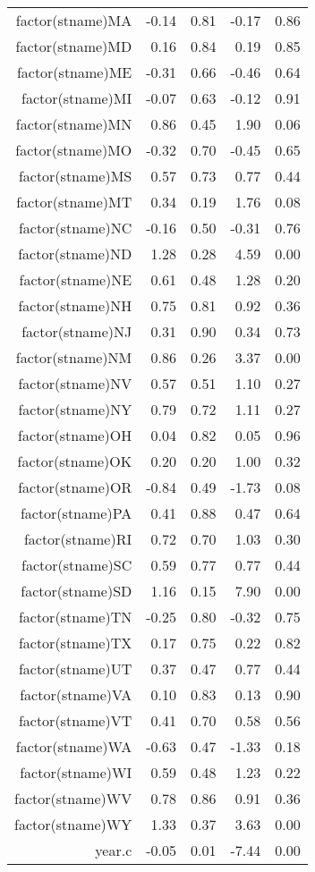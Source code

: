 \begin{table}[ht]
\begin{tabular}{rrrrr}
  factor(stname)MA & -0.14 & 0.81 & -0.17 & 0.86 \\ 
  factor(stname)MD & 0.16 & 0.84 & 0.19 & 0.85 \\ 
  factor(stname)ME & -0.31 & 0.66 & -0.46 & 0.64 \\ 
  factor(stname)MI & -0.07 & 0.63 & -0.12 & 0.91 \\ 
  factor(stname)MN & 0.86 & 0.45 & 1.90 & 0.06 \\ 
  factor(stname)MO & -0.32 & 0.70 & -0.45 & 0.65 \\ 
  factor(stname)MS & 0.57 & 0.73 & 0.77 & 0.44 \\ 
  factor(stname)MT & 0.34 & 0.19 & 1.76 & 0.08 \\ 
  factor(stname)NC & -0.16 & 0.50 & -0.31 & 0.76 \\ 
  factor(stname)ND & 1.28 & 0.28 & 4.59 & 0.00 \\ 
  factor(stname)NE & 0.61 & 0.48 & 1.28 & 0.20 \\ 
  factor(stname)NH & 0.75 & 0.81 & 0.92 & 0.36 \\ 
  factor(stname)NJ & 0.31 & 0.90 & 0.34 & 0.73 \\ 
  factor(stname)NM & 0.86 & 0.26 & 3.37 & 0.00 \\ 
  factor(stname)NV & 0.57 & 0.51 & 1.10 & 0.27 \\ 
  factor(stname)NY & 0.79 & 0.72 & 1.11 & 0.27 \\ 
  factor(stname)OH & 0.04 & 0.82 & 0.05 & 0.96 \\ 
  factor(stname)OK & 0.20 & 0.20 & 1.00 & 0.32 \\ 
  factor(stname)OR & -0.84 & 0.49 & -1.73 & 0.08 \\ 
  factor(stname)PA & 0.41 & 0.88 & 0.47 & 0.64 \\ 
  factor(stname)RI & 0.72 & 0.70 & 1.03 & 0.30 \\ 
  factor(stname)SC & 0.59 & 0.77 & 0.77 & 0.44 \\ 
  factor(stname)SD & 1.16 & 0.15 & 7.90 & 0.00 \\ 
  factor(stname)TN & -0.25 & 0.80 & -0.32 & 0.75 \\ 
  factor(stname)TX & 0.17 & 0.75 & 0.22 & 0.82 \\ 
  factor(stname)UT & 0.37 & 0.47 & 0.77 & 0.44 \\ 
  factor(stname)VA & 0.10 & 0.83 & 0.13 & 0.90 \\ 
  factor(stname)VT & 0.41 & 0.70 & 0.58 & 0.56 \\ 
  factor(stname)WA & -0.63 & 0.47 & -1.33 & 0.18 \\ 
  factor(stname)WI & 0.59 & 0.48 & 1.23 & 0.22 \\ 
  factor(stname)WV & 0.78 & 0.86 & 0.91 & 0.36 \\ 
  factor(stname)WY & 1.33 & 0.37 & 3.63 & 0.00 \\ 
  year.c & -0.05 & 0.01 & -7.44 & 0.00 \\ 
   \hline
\end{tabular}
\end{table}
